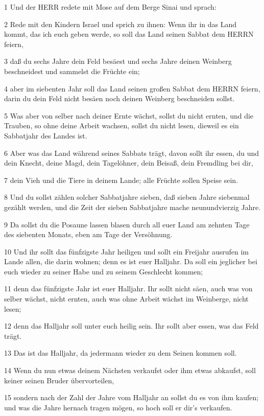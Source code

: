 \par 1 Und der HERR redete mit Mose auf dem Berge Sinai und sprach:
\par 2 Rede mit den Kindern Israel und sprich zu ihnen: Wenn ihr in das Land kommt, das ich euch geben werde, so soll das Land seinen Sabbat dem HERRN feiern,
\par 3 daß du sechs Jahre dein Feld besäest und sechs Jahre deinen Weinberg beschneidest und sammelst die Früchte ein;
\par 4 aber im siebenten Jahr soll das Land seinen großen Sabbat dem HERRN feiern, darin du dein Feld nicht besäen noch deinen Weinberg beschneiden sollst.
\par 5 Was aber von selber nach deiner Ernte wächst, sollst du nicht ernten, und die Trauben, so ohne deine Arbeit wachsen, sollst du nicht lesen, dieweil es ein Sabbatjahr des Landes ist.
\par 6 Aber was das Land während seines Sabbats trägt, davon sollt ihr essen, du und dein Knecht, deine Magd, dein Tagelöhner, dein Beisaß, dein Fremdling bei dir,
\par 7 dein Vieh und die Tiere in deinem Lande; alle Früchte sollen Speise sein.
\par 8 Und du sollst zählen solcher Sabbatjahre sieben, daß sieben Jahre siebenmal gezählt werden, und die Zeit der sieben Sabbatjahre mache neunundvierzig Jahre.
\par 9 Da sollst du die Posaune lassen blasen durch all euer Land am zehnten Tage des siebenten Monats, eben am Tage der Versöhnung.
\par 10 Und ihr sollt das fünfzigste Jahr heiligen und sollt ein Freijahr ausrufen im Lande allen, die darin wohnen; denn es ist euer Halljahr. Da soll ein jeglicher bei euch wieder zu seiner Habe und zu seinem Geschlecht kommen;
\par 11 denn das fünfzigste Jahr ist euer Halljahr. Ihr sollt nicht säen, auch was von selber wächst, nicht ernten, auch was ohne Arbeit wächst im Weinberge, nicht lesen;
\par 12 denn das Halljahr soll unter euch heilig sein. Ihr sollt aber essen, was das Feld trägt.
\par 13 Das ist das Halljahr, da jedermann wieder zu dem Seinen kommen soll.
\par 14 Wenn du nun etwas deinem Nächsten verkaufst oder ihm etwas abkaufst, soll keiner seinen Bruder übervorteilen,
\par 15 sondern nach der Zahl der Jahre vom Halljahr an sollst du es von ihm kaufen; und was die Jahre hernach tragen mögen, so hoch soll er dir's verkaufen.
